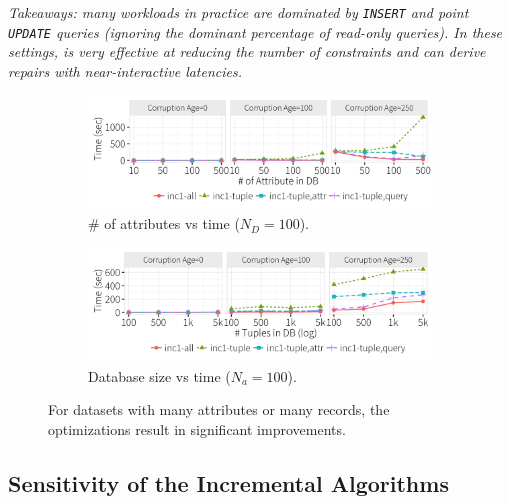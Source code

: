 {\it Takeaways: many workloads in practice are dominated by \texttt{INSERT} and point \texttt{UPDATE} queries (ignoring the dominant percentage of read-only queries).  
In these settings, \sys is very effective at reducing the number of constraints and can derive repairs with near-interactive latencies.}

 \begin{figure}[!htb]
    \vspace*{-.1in}
    \centering
    \begin{subfigure}[t]{.49\textwidth}
    \includegraphics[width = .99\columnwidth]{figures/attr_time}
    \vspace*{-.1in}
    \caption{\# of attributes vs time ($N_D = 100$).}
    \label{f:attr} 
    \end{subfigure}
    \begin{subfigure}[t]{.49\textwidth}
    \includegraphics[width = .99\columnwidth]{figures/attr100_time}
    \vspace*{-.1in}
    \caption{Database size vs time ($N_a = 100$).}
    \label{f:attr100} 
    \end{subfigure}
    \vspace*{-.1in}
    \caption{For datasets with many attributes or many records, the optimizations result in significant improvements.}
    \label{f:database}
  \end{figure}

\subsection{Sensitivity of the Incremental Algorithms}
\label{sec:experiments:inc}



